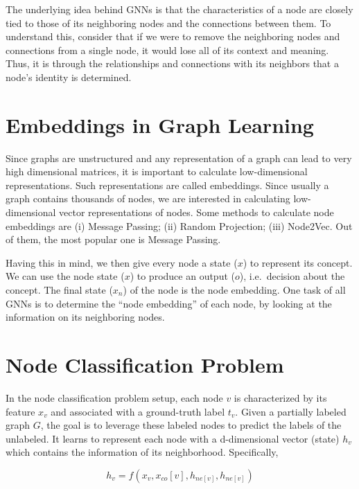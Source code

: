 \documentclass[
]{article}
\begin{document}
The underlying idea behind GNNs is that the characteristics of a node
are closely tied to those of its neighboring nodes and the connections
between them. To understand this, consider that if we were to remove the
neighboring nodes and connections from a single node, it would lose all
of its context and meaning. Thus, it is through the relationships and
connections with its neighbors that a node's identity is determined.

\hypertarget{embeddings-in-graph-learning}{%
\section{Embeddings in Graph
Learning}\label{embeddings-in-graph-learning}}

Since graphs are unstructured and any representation of a graph can lead
to very high dimensional matrices, it is important to calculate
low-dimensional representations. Such representations are called
embeddings. Since usually a graph contains thousands of nodes, we are
interested in calculating low-dimensional vector representations of
nodes. Some methods to calculate node embeddings are (i) Message
Passing; (ii) Random Projection; (iii) Node2Vec. Out of them, the most
popular one is Message Passing.

Having this in mind, we then give every node a state (\(x\)) to
represent its concept. We can use the node state (\(x\)) to produce an
output (\(o\)), i.e.~decision about the concept. The final state
(\(x_n\)) of the node is the node embedding. One task of all GNNs is to
determine the ``node embedding'' of each node, by looking at the
information on its neighboring nodes.

\hypertarget{node-classification-problem}{%
\section{Node Classification
Problem}\label{node-classification-problem}}

In the node classification problem setup, each node \(v\) is
characterized by its feature \(x_v\) and associated with a ground-truth
label \(t_v\). Given a partially labeled graph \(G\), the goal is to
leverage these labeled nodes to predict the labels of the unlabeled. It
learns to represent each node with a d-dimensional vector (state)
\(h_v\) which contains the information of its neighborhood.
Specifically,

\begin{equation}
h_v = f(x_v, x_{co}[v], h_{ne[v]}, h_{ne[v]})
\end{equation}
\end{document}
